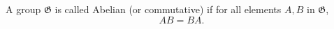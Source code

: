 A group $\mathfrak{G}$ is called Abelian (or commutative) if for all elements $A, B$ in $\mathfrak{G}$,
$$AB = BA.$$
